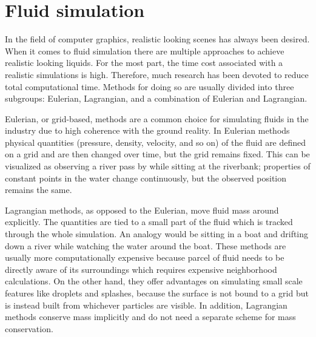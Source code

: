 \documentclass[../../main.tex]{subfiles}
\begin{document}
\tracingall


\section{Fluid simulation}
In the field of computer graphics, realistic looking scenes 
has always been desired. When it comes to fluid simulation there are multiple approaches to achieve realistic looking liquids. For the most part, the time cost associated with a realistic simulations is high. Therefore, much research has been devoted to reduce total computational time. Methods for doing so are usually divided into three subgroups: Eulerian, Lagrangian, and a combination of Eulerian and Lagrangian.






Eulerian, or grid-based, methods are a common choice for simulating fluids in the industry due to high coherence with the ground reality. In Eulerian methods physical quantities (pressure, density, velocity, and so on) of the fluid are defined on a grid and are then changed over time, but the grid remains fixed. This can be visualized as observing a river pass by while sitting at the riverbank; properties of constant points in the water change continuously, but the observed position remains the same. 

Lagrangian methods, as opposed to the Eulerian, move fluid mass around explicitly. The quantities are tied to a small part of the fluid which is tracked through the whole simulation. An analogy would be sitting in a boat and drifting down a river while watching the water around the boat. These methods are usually more computationally expensive because parcel of fluid needs to be directly aware of its surroundings which requires expensive neighborhood calculations. On the other hand, they offer advantages on simulating small scale features like droplets and splashes, because the surface is not bound to a grid but is instead built from whichever particles are visible. In addition, Lagrangian methods conserve mass implicitly and do not need a separate scheme for mass conservation. 
\end{document}
